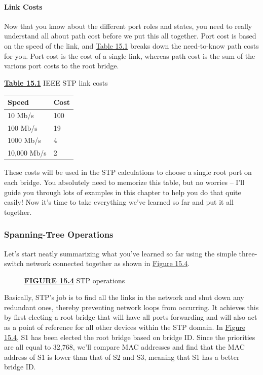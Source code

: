 \paragraph{Link Costs}

Now that you know about the different port roles and states, you need to
really understand all about path cost before we put this all together.
Port cost is based on the speed of the link, and
\protect\hyperlink{c15.xhtmlux5cux23table15-1}{Table 15.1} breaks down
the need-to-know path costs for you. Port cost is the cost of a single
link, whereas path cost is the sum of the various port costs to the root
bridge.



{\protect\hyperlink{c15.xhtmlux5cux23tableanchor15-1}{\textbf{Table
15.1}} IEEE STP link costs}

\begin{longtable}[]{@{}ll@{}}
\toprule
Speed & Cost\tabularnewline
\midrule
\endhead
10 Mb/s & 100\tabularnewline
100 Mb/s & 19\tabularnewline
1000 Mb/s & 4\tabularnewline
10,000 Mb/s & 2\tabularnewline
\bottomrule
\end{longtable}

These costs will be used in the STP calculations to choose a single root
port on each bridge. You absolutely need to memorize this table, but no
worries -- I'll guide you through lots of examples in this chapter to
help you do that quite easily! Now it's time to take everything we've
learned so far and put it all together.

\subsubsection[Spanning-Tree
Operations]{\texorpdfstring{\protect\hypertarget{c15.xhtmlux5cux23c15-sec-11}{}{}Spanning-Tree
Operations}{Spanning-Tree Operations}}

Let's start neatly summarizing what you've learned so far using the
simple three-switch network connected together as shown in
\protect\hyperlink{c15.xhtmlux5cux23figure15-4}{Figure 15.4}.

\begin{figure}
\centering
\caption{{\protect\hyperlink{c15.xhtmlux5cux23figureanchor15-4}{\textbf{FIGURE
15.4}} STP operations}}
\end{figure}

Basically, STP's job is to find all the links in the network and shut
down any redundant ones, thereby preventing network loops from
occurring. It achieves this by first electing a root bridge that will
have all ports forwarding and will also act as a point of reference for
all other devices within the STP domain. In
\protect\hyperlink{c15.xhtmlux5cux23figure15-4}{Figure 15.4}, S1 has
been elected the root
bridge based on
bridge ID. Since the priorities are all equal to 32,768, we'll compare
MAC addresses and find that the MAC address of S1 is lower than that of
S2 and S3, meaning that S1 has a better bridge ID.

